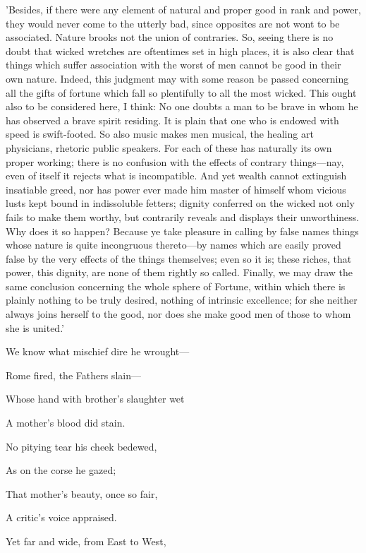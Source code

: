 'Besides, if there were any element of natural and proper good in rank
and power, they would never come to the utterly bad, since opposites are
not wont to be associated. Nature brooks not the union of contraries.
So, seeing there is no doubt that wicked wretches are oftentimes set in
high places, it is also clear that things which suffer association with
the worst of men cannot be good in their own nature. Indeed, this
judgment may with some reason be passed concerning all the gifts of
fortune which fall so plentifully to all the most wicked. This ought
also to be considered here, I think: No one doubts a man to be brave in
whom he has observed a brave spirit residing. It is plain that one who
is endowed with speed is swift-footed. So also music makes men musical,
the healing art physicians, rhetoric public speakers. For each of these
has naturally its own proper working; there is no confusion with the
effects of contrary things—nay, even of itself it rejects what is
incompatible. And yet wealth cannot extinguish insatiable greed, nor has
power ever made him master of himself whom vicious lusts kept bound in
indissoluble fetters; dignity conferred on the wicked not only fails to
make them worthy, but contrarily reveals and displays their
unworthiness. Why does it so happen? Because ye take pleasure in calling
by false names things whose nature is quite incongruous thereto—by
names which are easily proved false by the very effects of the things
themselves; even so it is; these riches, that power, this dignity, are
none of them rightly so called. Finally, we may draw the same conclusion
concerning the whole sphere of Fortune, within which there is plainly
nothing to be truly desired, nothing of intrinsic excellence; for she
neither always joins herself to the good, nor does she make good men of
those to whom she is united.'


We know what mischief dire he wrought—

Rome fired, the Fathers slain—

Whose hand with brother's slaughter wet

A mother's blood did stain.

No pitying tear his cheek bedewed,

As on the corse he gazed;

That mother's beauty, once so fair,

A critic's voice appraised.

Yet far and wide, from East to West,

